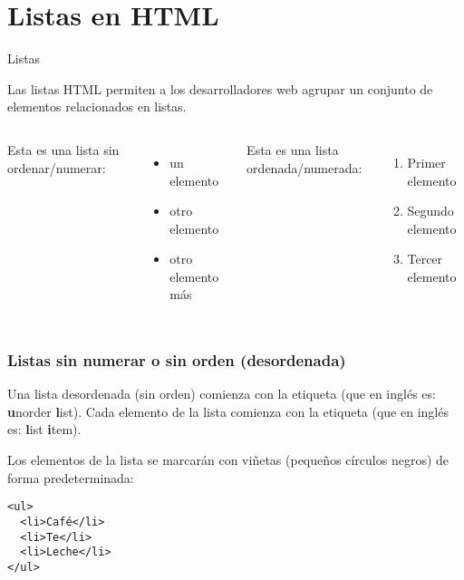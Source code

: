 
\section{Listas en HTML}

\begin{frame}[c]{Listas}

  Las listas HTML permiten a los desarrolladores web agrupar
  un conjunto de elementos relacionados en listas.

  \vspace{\baselineskip}
  \begin{columns}
      Esta es una lista sin ordenar/numerar:
      \begin{itemize}
        \item un elemento
        \item otro elemento
        \item otro elemento más 
      \end{itemize}
      Esta es una lista ordenada/numerada:
      \begin{enumerate}
        \item Primer elemento
        \item Segundo elemento
        \item Tercer elemento
      \end{enumerate}
  \end{columns}
\end{frame}

\begin{frame}[fragile]
  \frametitle{Listas sin numerar o sin orden (desordenada)}

  Una lista desordenada (sin orden) comienza con la
  etiqueta  (que en inglés
  es: \textbf{u}norder \textbf{l}ist).
  Cada elemento de la lista comienza con la etiqueta  (que en
  inglés es: \textbf{l}ist \textbf{i}tem).

  \vspace{\baselineskip}
  Los elementos de la lista se marcarán con viñetas
  (pequeños círculos negros) de forma predeterminada:

  \vspace{\baselineskip}
  \begin{lstlisting}
<ul>
  <li>Café</li>
  <li>Te</li>
  <li>Leche</li>
</ul>  
  \end{lstlisting}
\end{frame}

